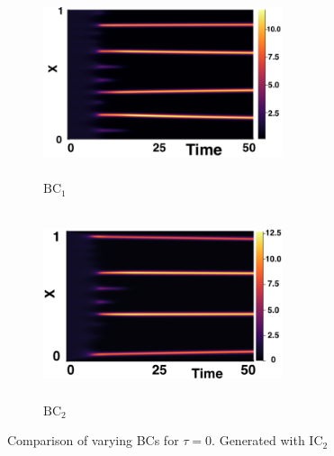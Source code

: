 \begin{figure}[H]
    \centering
    \begin{subfigure}[b]{0.45\textwidth}
        \centering
        \includegraphics[width=7cm,height=5.5cm]{ic20.png}
        \caption{$\text{BC}_1$}
        \label{}
    \end{subfigure}
    \hfill
    \begin{subfigure}[b]{0.45\textwidth}
        \centering
        \includegraphics[width=7cm,height=5.5cm]{bc0.png}
        \caption{$\text{BC}_2$}
        \label{}
    \end{subfigure}
    \caption{Comparison of varying BCs for $\tau=0$. Generated with $\text{IC}_2$}
    \label{fig:bctau1}
\end{figure}

